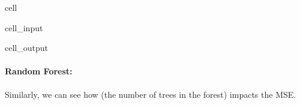 \documentclass[letterpaper,10pt,english]{jupyterBook}
\begin{document}
\begin{sphinxuseclass}{cell}
\begin{sphinxVerbatimInput}
\begin{sphinxuseclass}{cell_input}
\end{sphinxuseclass}\end{sphinxVerbatimInput}
\begin{sphinxVerbatimOutput}

\begin{sphinxuseclass}{cell_output}
\noindent{}

\end{sphinxuseclass}\end{sphinxVerbatimOutput}

\end{sphinxuseclass}

\paragraph{Random Forest: }
\label{\detokenize{03:random-forest-n-estimators}}
\sphinxAtStartPar
Similarly, we can see how  (the number of trees in the forest) impacts the MSE.
\end{document}

